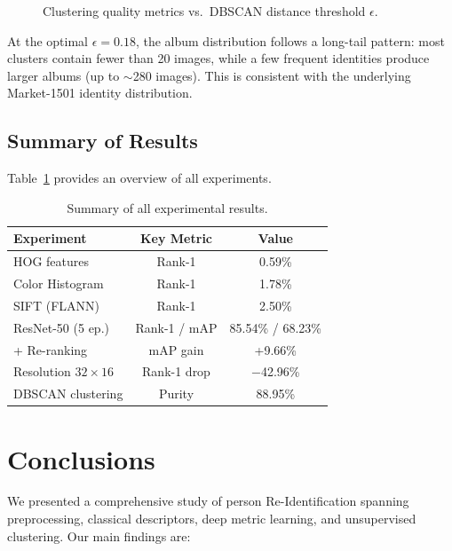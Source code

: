 \documentclass[final]{cvpr}
\begin{document}
\begin{figure}[h]
\centering
{}
\caption{Clustering quality metrics vs.\ DBSCAN distance threshold $\epsilon$.}
\label{fig:clustering}
\end{figure}

At the optimal $\epsilon = 0.18$, the album distribution follows a long-tail pattern: most clusters contain fewer than 20 images, while a few frequent identities produce larger albums (up to $\sim$280 images).
This is consistent with the underlying Market-1501 identity distribution.

\subsection{Summary of Results}

Table~\ref{tab:summary} provides an overview of all experiments.

\begin{table}[h]
\centering
\caption{Summary of all experimental results.}
\label{tab:summary}
\begin{tabular}{lcc}
\toprule
\textbf{Experiment} & \textbf{Key Metric} & \textbf{Value} \\
\midrule
HOG features & Rank-1 & 0.59\% \\
Color Histogram & Rank-1 & 1.78\% \\
SIFT (FLANN) & Rank-1 & 2.50\% \\
ResNet-50 (5 ep.) & Rank-1 / mAP & 85.54\% / 68.23\% \\
+ Re-ranking & mAP gain & +9.66\% \\
Resolution $32\times16$ & Rank-1 drop & $-$42.96\% \\
DBSCAN clustering & Purity & 88.95\% \\
\bottomrule
\end{tabular}
\end{table}

\section{Conclusions}

We presented a comprehensive study of person Re-Identification spanning preprocessing, classical descriptors, deep metric learning, and unsupervised clustering.
Our main findings are:
\end{document}
